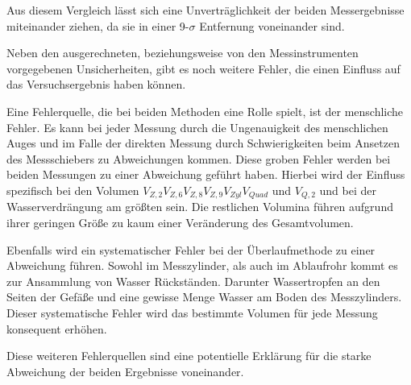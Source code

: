 \noindent
Aus diesem Vergleich lässt sich eine Unverträglichkeit der beiden Messergebnisse miteinander ziehen, da sie in einer 9-$\sigma$ Entfernung voneinander sind.

\noindent
Neben den ausgerechneten, beziehungsweise von den Messinstrumenten vorgegebenen Unsicherheiten, gibt es noch weitere Fehler, die einen Einfluss auf das Versuchsergebnis haben können. 

\noindent
Eine Fehlerquelle, die bei beiden Methoden eine Rolle spielt, ist der menschliche Fehler. Es kann bei jeder Messung durch die Ungenauigkeit des menschlichen Auges und im Falle der direkten Messung durch Schwierigkeiten beim Ansetzen des Messschiebers zu Abweichungen kommen. Diese groben Fehler werden bei beiden Messungen zu einer Abweichung geführt haben. Hierbei wird der Einfluss spezifisch bei den 
Volumen $V_{Z,2} V_{Z,6}  V_{Z,8} V_{Z,9} V_{Zyl} V_{Quad}$ und $V_{Q,2}$ und bei der Wasserverdrängung am größten sein. Die restlichen Volumina führen aufgrund ihrer geringen Größe zu kaum einer Veränderung des Gesamtvolumen. 

\noindent
Ebenfalls wird ein systematischer Fehler bei der Überlaufmethode zu einer Abweichung führen. Sowohl im Messzylinder, als auch im Ablaufrohr kommt es zur Ansammlung von Wasser Rückständen. Darunter Wassertropfen an den Seiten der Gefäße und eine gewisse Menge Wasser am Boden des Messzylinders. Dieser systematische Fehler wird das bestimmte Volumen für jede Messung konsequent erhöhen. 

\noindent
Diese weiteren Fehlerquellen sind eine potentielle Erklärung für die starke Abweichung der beiden Ergebnisse voneinander. 

%
%
